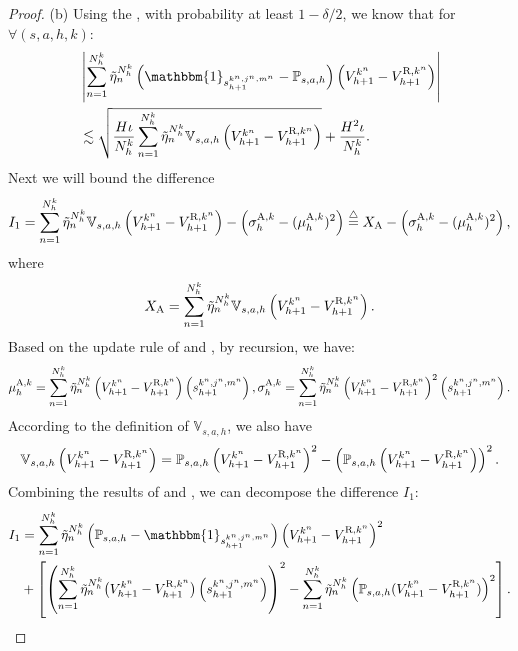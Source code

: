 \documentclass{article}
\newcommand{\R}{\textnormal{R}}
\newcommand{\A}{\textnormal{A}}
\begin{document}
\begin{proof}
    (b) Using the , with probability at least $1-\delta /2$, we know that for $\forall (s,a,h,k)$:
    \begin{align}
    \label{advpositive}
        &\left|\sum_{n=1}^{N_h^k} \Tilde{\eta}_n^{N_h^k}\left(\mathbbm{1}_{s_{h+1}^{k^n,j^n,m^n}}-\mathbb{P}_{s,a,h}\right) \left(V_{h+1}^{k^n} - V_{h+1}^{\R,k^n}\right)\right| \nonumber\\
        &\lesssim \sqrt{\frac{H\iota}{N_h^k} \sum_{n=1}^{N_h^k} \Tilde{\eta}_n^{N_h^k} \mathbb{V}_{s,a,h}\left(V_{h+1}^{k^n} - V_{h+1}^{\R,k^n}\right)} + \frac{H^2\iota}{N_h^k}.
    \end{align}
    Next we will bound the difference $$I_1 = \sum_{n=1}^{N_h^k} \Tilde{\eta}_n^{N_h^k}\mathbb{V}_{s,a,h}\left(V_{h+1}^{k^n} - V_{h+1}^{\R,k^n}\right) - \left(\sigma_h^{\A,k}-(\mu_h^{\A,k})^2\right) \overset{\triangle}{=} X_{\A}- \left(\sigma_h^{\A,k}-(\mu_h^{\A,k})^2\right),$$
    where $$X_{\A} = \sum_{n=1}^{N_h^k} \Tilde{\eta}_n^{N_h^k}\mathbb{V}_{s,a,h}\left(V_{h+1}^{k^n} - V_{h+1}^{\R,k^n}\right).$$
    Based on the update rule of  and , by recursion, we have:
    \begin{equation}
    \label{musigmaadv}
        \mu_h^{\A,k} = \sum_{n=1}^{N_h^k}\Tilde{\eta}_n^{N_h^k}\left(V_{h+1}^{k^n}-V_{h+1}^{\R,k^n}\right)\left(s_{h+1}^{k^n,j^n,m^n}\right),\sigma_h^{\A,k} = \sum_{n=1}^{N_h^k}\Tilde{\eta}_n^{N_h^k}\left(V_{h+1}^{k^n}-V_{h+1}^{\R,k^n}\right)^2\left(s_{h+1}^{k^n,j^n,m^n}\right).
    \end{equation}
    According to the definition of $\mathbb{V}_{s,a,h}$, we also have
    \begin{equation}
        \label{defV}
        \mathbb{V}_{s,a,h}\left(V_{h+1}^{k^n} - V_{h+1}^{\R,k^n}\right) = \mathbb{P}_{s,a,h}\left(V_{h+1}^{k^n} - V_{h+1}^{\R,k^n}\right)^2 - \left(\mathbb{P}_{s,a,h} \left(V_{h+1}^{k^n} - V_{h+1}^{\R,k^n}\right)\right)^2.
    \end{equation}
    Combining the results of  and , we can decompose the difference $I_1$:
    \begin{align}
        \label{i1middle}
        I_1 &= \sum_{n= 1}^{N_h^k}\Tilde{\eta}_n^{N_h^k} \left( \mathbb{P}_{s,a,h} - \mathbbm{1}_{s_{h+1}^{k^n,j^n,m^n}}\right)\left(V_{h+1}^{k^n} - V_{h+1}^{\R,k^n}\right)^2  \nonumber\\
        &+ \left[\left(\sum_{n=1}^{N_h^k}\Tilde{\eta}_n^{N_h^k}\big(V_{h+1}^{k^n}-V_{h+1}^{\R,k^n}\big)\left(s_{h+1}^{k^n,j^n,m^n}\right)\right)^2- \sum_{n= 1}^{N_h^k}\Tilde{\eta}_n^{N_h^k}\left(\mathbb{P}_{s,a,h} (V_{h+1}^{k^n} - V_{h+1}^{\R,k^n})\right)^2\right].

\end{align}
\end{proof}
\end{document}
